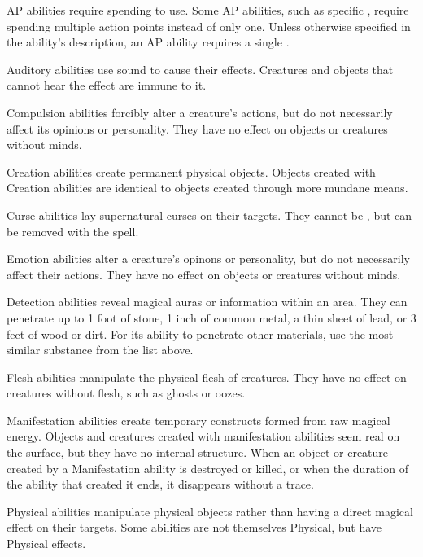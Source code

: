          AP abilities require spending  to use.
        Some AP abilities, such as specific , require spending multiple action points instead of only one.
        Unless otherwise specified in the ability's description, an AP ability requires a single .

         Auditory abilities use sound to cause their effects.
        Creatures and objects that cannot hear the effect are immune to it.

         Compulsion abilities forcibly alter a creature's actions, but do not necessarily affect its opinions or personality.
        They have no effect on objects or creatures without minds.

         Creation abilities create permanent physical objects.
        Objects created with Creation abilities are identical to objects created through more mundane means.

         Curse abilities lay supernatural curses on their targets.
        They cannot be , but can be removed with the  spell.

         Emotion abilities alter a creature's opinons or personality, but do not necessarily affect their actions.
        They have no effect on objects or creatures without minds.

         Detection abilities reveal magical auras or information within an area.
        They can penetrate up to 1 foot of stone, 1 inch of common metal, a thin sheet of lead, or 3 feet of wood or dirt.
        For its ability to penetrate other materials, use the most similar substance from the list above.

         Flesh abilities manipulate the physical flesh of creatures.
        They have no effect on creatures without flesh, such as ghosts or oozes.

         Manifestation abilities create temporary constructs formed from raw magical energy.
        Objects and creatures created with manifestation abilities seem real on the surface, but they have no internal structure.
        When an object or creature created by a Manifestation ability is destroyed or killed, or when the duration of the ability that created it ends, it disappears without a trace.

         Physical abilities manipulate physical objects rather than having a direct magical effect on their targets.
        Some abilities are not themselves Physical, but have Physical effects.


